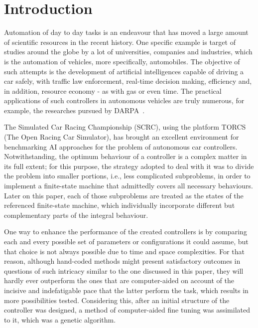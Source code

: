 \section{\textbf{Introduction}} \label{sec:Intro}
	
	Automation of day to day tasks is an endeavour that has moved a large amount of scientific resources in the
	recent history. One specific example is target of studies around the globe by a lot of universities, companies
	and industries, which is the automation of vehicles, more specifically, automobiles. The objective of such
	attempts is the development of artificial intelligences capable of driving a car safely, with traffic law
	enforcement, real-time decision making, efficiency and, in addition, resource economy - as with gas or even
	time. The practical applications of such controllers in autonomous vehicles are truly numerous, for example, the
	researches pursued by DARPA~\cite{DARPA}.

	The Simulated Car Racing Championship (SCRC), using the platform TORCS (The Open Racing Car Simulator), has
	brought an excellent environment for benchmarking AI approaches for the problem of autonomous car controllers.
	Notwithstanding, the optimum behaviour of a controller is a complex matter in its full extent; for this purpose,
	the strategy adopted to deal with it was to divide the problem into smaller portions, i.e., less complicated
	subproblems, in order to implement a finite-state machine that admittedly covers all necessary behaviours. Later
	on this paper, each of those subproblems are treated as the states of the referenced finite-state machine, which
	individually incorporate different but complementary parts of the integral behaviour.
	
	One way to enhance the performance of the created controllers is by comparing each and every possible set of
	parameters or configurations it could assume, but that choice is not always possible due to time and space
	complexities. For that reason, although hand-coded methods might present satisfactory outcomes in questions of
	such intricacy similar to the one discussed in this paper, they will hardly ever outperform the ones that are
	computer-aided on account of the incisive and indefatigable pace that the latter perform the task, which results
	in more possibilities tested. Considering this, after an initial structure of the controller was designed, a
	method of computer-aided fine tuning was assimilated to it, which was a genetic algorithm.
	
